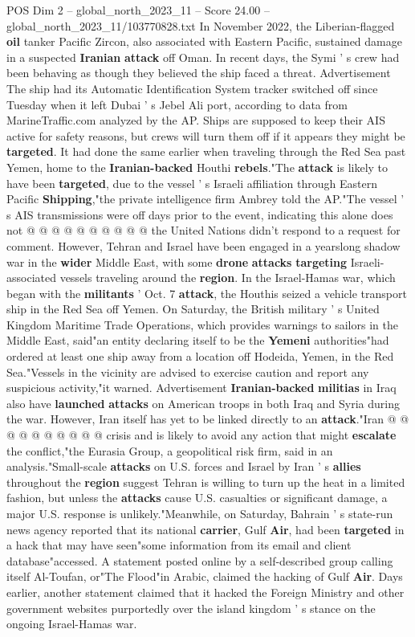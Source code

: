 \begin{textsample}{POS Dim 2 – global\_north\_2023\_11 – Score 24.00 – global\_north\_2023\_11/103770828.txt}
In November 2022, the Liberian-flagged \textbf{oil} tanker Pacific Zircon, also associated with Eastern Pacific, sustained damage in a suspected \textbf{Iranian} \textbf{attack} off Oman.
In recent days, the Symi ' s crew had been behaving as though they believed the ship faced a threat.
Advertisement The ship had its Automatic Identification System tracker switched off since Tuesday when it left Dubai ' s Jebel Ali port, according to data from MarineTraffic.com analyzed by the AP.
Ships are supposed to keep their AIS active for safety reasons, but crews will turn them off if it appears they might be \textbf{targeted}.
It had done the same earlier when traveling through the Red Sea past Yemen, home to the \textbf{Iranian-backed} Houthi \textbf{rebels}."The \textbf{attack} is likely to have been \textbf{targeted}, due to the vessel ' s Israeli affiliation through Eastern Pacific \textbf{Shipping},"the private intelligence firm Ambrey told the AP."The vessel ' s AIS transmissions were off days prior to the event, indicating this alone does not @ @ @ @ @ @ @ @ @ @ the United Nations didn't respond to a request for comment.
However, Tehran and Israel have been engaged in a yearslong shadow war in the \textbf{wider} Middle East, with some \textbf{drone} \textbf{attacks} \textbf{targeting} Israeli-associated vessels traveling around the \textbf{region}.
In the Israel-Hamas war, which began with the \textbf{militants} ' Oct. 7 \textbf{attack}, the Houthis seized a vehicle transport ship in the Red Sea off Yemen.
On Saturday, the British military ' s United Kingdom Maritime Trade Operations, which provides warnings to sailors in the Middle East, said"an entity declaring itself to be the \textbf{Yemeni} authorities"had ordered at least one ship away from a location off Hodeida, Yemen, in the Red Sea."Vessels in the vicinity are advised to exercise caution and report any suspicious activity,"it warned.
Advertisement \textbf{Iranian-backed} \textbf{militias} in Iraq also have \textbf{launched} \textbf{attacks} on American troops in both Iraq and Syria during the war.
However, Iran itself has yet to be linked directly to an \textbf{attack}."Iran @ @ @ @ @ @ @ @ @ @ crisis and is likely to avoid any action that might \textbf{escalate} the conflict,"the Eurasia Group, a geopolitical risk firm, said in an analysis."Small-scale \textbf{attacks} on U.S. forces and Israel by Iran ' s \textbf{allies} throughout the \textbf{region} suggest Tehran is willing to turn up the heat in a limited fashion, but unless the \textbf{attacks} cause U.S. casualties or significant damage, a major U.S. response is unlikely."Meanwhile, on Saturday, Bahrain ' s state-run news agency reported that its national \textbf{carrier}, Gulf \textbf{Air}, had been \textbf{targeted} in a hack that may have seen"some information from its email and client database"accessed.
A statement posted online by a self-described group calling itself Al-Toufan, or"The Flood"in Arabic, claimed the hacking of Gulf \textbf{Air}.
Days earlier, another statement claimed that it hacked the Foreign Ministry and other government websites purportedly over the island kingdom ' s stance on the ongoing Israel-Hamas war.


\end{textsample}
